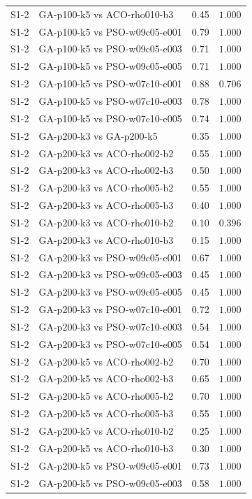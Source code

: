 \begin{tabular}{llrr}
S1-2 & GA-p100-k5 vs ACO-rho010-b3 & 0.45 & $1.000$ \\
S1-2 & GA-p100-k5 vs PSO-w09c05-e001 & 0.79 & $1.000$ \\
S1-2 & GA-p100-k5 vs PSO-w09c05-e003 & 0.71 & $1.000$ \\
S1-2 & GA-p100-k5 vs PSO-w09c05-e005 & 0.71 & $1.000$ \\
S1-2 & GA-p100-k5 vs PSO-w07c10-e001 & 0.88 & $0.706$ \\
S1-2 & GA-p100-k5 vs PSO-w07c10-e003 & 0.78 & $1.000$ \\
S1-2 & GA-p100-k5 vs PSO-w07c10-e005 & 0.74 & $1.000$ \\
S1-2 & GA-p200-k3 vs GA-p200-k5 & 0.35 & $1.000$ \\
S1-2 & GA-p200-k3 vs ACO-rho002-b2 & 0.55 & $1.000$ \\
S1-2 & GA-p200-k3 vs ACO-rho002-b3 & 0.50 & $1.000$ \\
S1-2 & GA-p200-k3 vs ACO-rho005-b2 & 0.55 & $1.000$ \\
S1-2 & GA-p200-k3 vs ACO-rho005-b3 & 0.40 & $1.000$ \\
S1-2 & GA-p200-k3 vs ACO-rho010-b2 & 0.10 & $0.396$ \\
S1-2 & GA-p200-k3 vs ACO-rho010-b3 & 0.15 & $1.000$ \\
S1-2 & GA-p200-k3 vs PSO-w09c05-e001 & 0.67 & $1.000$ \\
S1-2 & GA-p200-k3 vs PSO-w09c05-e003 & 0.45 & $1.000$ \\
S1-2 & GA-p200-k3 vs PSO-w09c05-e005 & 0.45 & $1.000$ \\
S1-2 & GA-p200-k3 vs PSO-w07c10-e001 & 0.72 & $1.000$ \\
S1-2 & GA-p200-k3 vs PSO-w07c10-e003 & 0.54 & $1.000$ \\
S1-2 & GA-p200-k3 vs PSO-w07c10-e005 & 0.54 & $1.000$ \\
S1-2 & GA-p200-k5 vs ACO-rho002-b2 & 0.70 & $1.000$ \\
S1-2 & GA-p200-k5 vs ACO-rho002-b3 & 0.65 & $1.000$ \\
S1-2 & GA-p200-k5 vs ACO-rho005-b2 & 0.70 & $1.000$ \\
S1-2 & GA-p200-k5 vs ACO-rho005-b3 & 0.55 & $1.000$ \\
S1-2 & GA-p200-k5 vs ACO-rho010-b2 & 0.25 & $1.000$ \\
S1-2 & GA-p200-k5 vs ACO-rho010-b3 & 0.30 & $1.000$ \\
S1-2 & GA-p200-k5 vs PSO-w09c05-e001 & 0.73 & $1.000$ \\
S1-2 & GA-p200-k5 vs PSO-w09c05-e003 & 0.58 & $1.000$ \\

\end{tabular}
